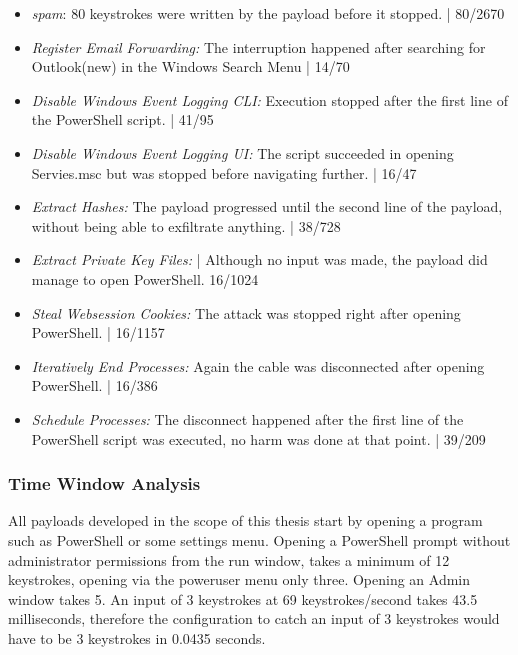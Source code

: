 \begin{itemize}
    \item  \emph{spam}: 80 keystrokes were written by the payload before it stopped. | 80/2670
    \item  \emph{Register Email Forwarding:} The interruption happened after searching for Outlook(new) in the Windows Search Menu  | 14/70 
    \item  \emph{Disable Windows Event Logging CLI:}  Execution stopped after the first line of the PowerShell script. | 41/95
    \item  \emph{Disable Windows Event Logging UI:} The script succeeded in opening Servies.msc but was stopped before navigating further. | 16/47
    \item  \emph{Extract Hashes:}  The payload progressed until the second line of the payload, without being able to exfiltrate anything. | 38/728 
    \item  \emph{Extract Private Key Files:}  | Although no input was made, the payload did manage to open PowerShell. 16/1024
    \item  \emph{Steal Websession Cookies:} The attack was stopped right after opening PowerShell. | 16/1157
    \item  \emph{Iteratively End Processes:} Again the cable was disconnected after opening PowerShell. | 16/386
    \item  \emph{Schedule Processes:} The disconnect happened after the first line of the PowerShell script was executed, no harm was done at that point. | 39/209
\end{itemize}





















\subsubsection{Time Window Analysis}

All payloads developed in the scope of this thesis start by opening a program such as PowerShell or some settings menu. Opening a PowerShell prompt without administrator permissions from the run window, takes a minimum of 12 keystrokes, opening via the poweruser menu only three. Opening an Admin window takes 5. 
An input of 3 keystrokes at 69 keystrokes/second takes 43.5 milliseconds, therefore the configuration to catch an input of 3 keystrokes would have to be 3 keystrokes in 0.0435 seconds.

